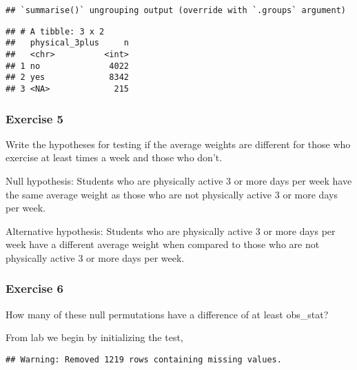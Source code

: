 \documentclass[
]{article}
\newenvironment{Shaded}{\begin{snugshade}}{\end{snugshade}}
\newcommand{\DataTypeTok}[1]{\textcolor[rgb]{0.13,0.29,0.53}{#1}}
\newcommand{\KeywordTok}[1]{\textcolor[rgb]{0.13,0.29,0.53}{\textbf{#1}}}
\newcommand{\NormalTok}[1]{#1}
\newcommand{\OperatorTok}[1]{\textcolor[rgb]{0.81,0.36,0.00}{\textbf{#1}}}
\newcommand{\StringTok}[1]{\textcolor[rgb]{0.31,0.60,0.02}{#1}}
\begin{document}
\begin{verbatim}
## `summarise()` ungrouping output (override with `.groups` argument)
\end{verbatim}

\begin{verbatim}
## # A tibble: 3 x 2
##   physical_3plus     n
##   <chr>          <int>
## 1 no              4022
## 2 yes             8342
## 3 <NA>             215
\end{verbatim}

\hypertarget{exercise-5}{%
\subsubsection{Exercise 5}\label{exercise-5}}

Write the hypotheses for testing if the average weights are different
for those who exercise at least times a week and those who don't.

Null hypothesis: Students who are physically active 3 or more days per
week have the same average weight as those who are not physically active
3 or more days per week.

Alternative hypothesis: Students who are physically active 3 or more
days per week have a different average weight when compared to those who
are not physically active 3 or more days per week.

\hypertarget{exercise-6}{%
\subsubsection{Exercise 6}\label{exercise-6}}

How many of these null permutations have a difference of at least
obs\_stat?

From lab we begin by initializing the test,

\begin{Shaded}
\end{Shaded}

\begin{verbatim}
## Warning: Removed 1219 rows containing missing values.
\end{verbatim}
\end{document}
